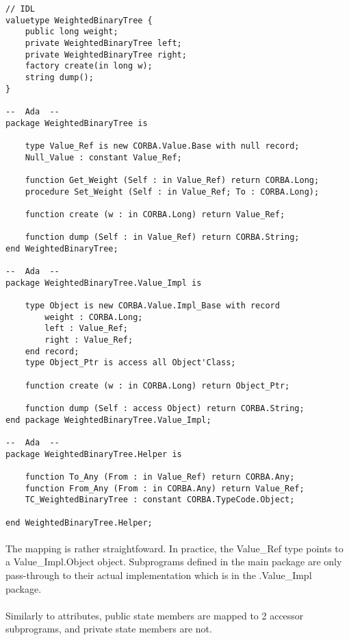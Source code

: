 \begin{verbatim}
// IDL
valuetype WeightedBinaryTree {
	public long weight;
	private WeightedBinaryTree left;
	private WeightedBinaryTree right;
	factory create(in long w);
	string dump();
}

--  Ada  --
package WeightedBinaryTree is

	type Value_Ref is new CORBA.Value.Base with null record;
	Null_Value : constant Value_Ref;

	function Get_Weight (Self : in Value_Ref) return CORBA.Long;
	procedure Set_Weight (Self : in Value_Ref; To : CORBA.Long);

	function create (w : in CORBA.Long) return Value_Ref;

	function dump (Self : in Value_Ref) return CORBA.String;
end WeightedBinaryTree;

--  Ada  --
package WeightedBinaryTree.Value_Impl is

	type Object is new CORBA.Value.Impl_Base with record
		weight : CORBA.Long;
		left : Value_Ref;
		right : Value_Ref;
	end record;
	type Object_Ptr is access all Object'Class;

	function create (w : in CORBA.Long) return Object_Ptr;

	function dump (Self : access Object) return CORBA.String;
end package WeightedBinaryTree.Value_Impl;

--  Ada  --
package WeightedBinaryTree.Helper is

	function To_Any (From : in Value_Ref) return CORBA.Any;
	function From_Any (From : in CORBA.Any) return Value_Ref;
	TC_WeightedBinaryTree : constant CORBA.TypeCode.Object;

end WeightedBinaryTree.Helper;
\end{verbatim}

\paragraph{} The mapping is rather straightfoward. In practice, the
Value\_Ref type points to a Value\_Impl.Object object. Subprograms
defined in the main package are only pass-through to their actual
implementation which is in the .Value\_Impl package.

\paragraph{}Similarly to attributes, public state members are mapped
to 2 accessor subprograms, and private state members are not.

